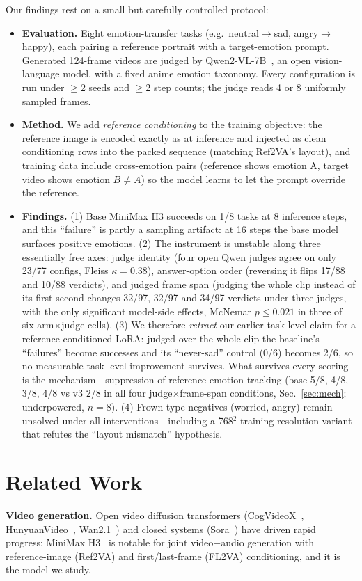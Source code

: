 \documentclass{article}
\begin{document}
Our findings rest on a small but carefully controlled protocol:
\begin{itemize}
\item \textbf{Evaluation.} Eight emotion-transfer tasks (e.g.\ neutral$\rightarrow$sad,
angry$\rightarrow$happy), each pairing a reference portrait with a target-emotion prompt.
Generated 124-frame videos are judged by Qwen2-VL-7B~\cite{qwen2vl2024}, an open vision-language
model, with a fixed anime emotion taxonomy. Every configuration is run under $\ge$2 seeds and
$\ge$2 step counts; the judge reads 4 or 8 uniformly sampled frames.
\item \textbf{Method.} We add \emph{reference conditioning} to the training objective: the
reference image is encoded exactly as at inference and injected as clean conditioning rows into
the packed sequence (matching Ref2VA's layout), and training data include cross-emotion pairs
(reference shows emotion A, target video shows emotion $B\neq A$) so the model learns to let the
prompt override the reference.
\item \textbf{Findings.} (1) Base MiniMax H3 succeeds on 1/8 tasks at 8 inference steps, and this
``failure'' is partly a sampling artifact: at 16 steps the base model surfaces positive emotions.
(2) The instrument is unstable along three essentially free axes: judge identity (four open Qwen
judges agree on only 23/77 configs, Fleiss $\kappa{=}0.38$), answer-option order (reversing it flips
17/88 and 10/88 verdicts), and judged frame span (judging the whole clip instead of its first second
changes 32/97, 32/97 and 34/97 verdicts under three judges, with the only significant model-side
effects, McNemar $p{\le}0.021$ in three of six arm$\times$judge cells).
(3) We therefore \emph{retract} our earlier task-level claim for a reference-conditioned LoRA: judged
over the whole clip the baseline's ``failures'' become successes and its ``never-sad'' control (0/6)
becomes 2/6, so no measurable task-level improvement survives. What survives every scoring is the
mechanism---suppression of reference-emotion tracking (base 5/8, 4/8, 3/8, 4/8 vs v3 2/8 in all four
judge$\times$frame-span conditions, Sec.~\ref{sec:mech}; underpowered, $n{=}8$). (4) Frown-type
negatives (worried, angry) remain unsolved under all interventions---including a 768$^2$
training-resolution variant that refutes the ``layout mismatch'' hypothesis.
\end{itemize}

\section{Related Work}
\textbf{Video generation.} Open video diffusion transformers (CogVideoX~\cite{cogvideox2024},
HunyuanVideo~\cite{hunyuan2024}, Wan2.1~\cite{wan2025}) and closed systems
(Sora~\cite{sora2024}) have driven rapid progress; MiniMax H3~\cite{minimax2025} is notable for
joint video+audio generation with reference-image (Ref2VA) and first/last-frame (FL2VA)
conditioning, and it is the model we study.
\end{document}
